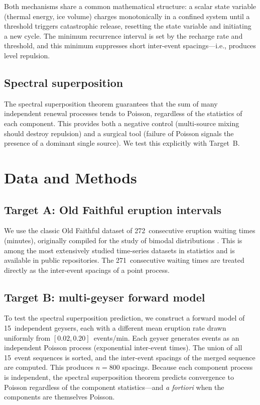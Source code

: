\documentclass[12pt,a4paper]{article}
\begin{document}
Both mechanisms share a common mathematical structure: a scalar state variable (thermal energy, ice volume) charges monotonically in a confined system until a threshold triggers catastrophic release, resetting the state variable and initiating a new cycle. The minimum recurrence interval is set by the recharge rate and threshold, and this minimum suppresses short inter-event spacings---i.e., produces level repulsion.

\subsection{Spectral superposition}

The spectral superposition theorem \citep{daley2003} guarantees that the sum of many independent renewal processes tends to Poisson, regardless of the statistics of each component. This provides both a negative control (multi-source mixing should destroy repulsion) and a surgical tool (failure of Poisson signals the presence of a dominant single source). We test this explicitly with Target~B.

\section{Data and Methods}

\subsection{Target A: Old Faithful eruption intervals}

We use the classic Old Faithful dataset of 272~consecutive eruption waiting times (minutes), originally compiled for the study of bimodal distributions \citep{azzalini1990,haerdle1991}. This is among the most extensively studied time-series datasets in statistics and is available in public repositories. The 271~consecutive waiting times are treated directly as the inter-event spacings of a point process.

\subsection{Target B: multi-geyser forward model}

To test the spectral superposition prediction, we construct a forward model of 15~independent geysers, each with a different mean eruption rate drawn uniformly from $[0.02,0.20]$~events/min. Each geyser generates events as an independent Poisson process (exponential inter-event times). The union of all 15~event sequences is sorted, and the inter-event spacings of the merged sequence are computed. This produces $n=800$ spacings. Because each component process is independent, the spectral superposition theorem predicts convergence to Poisson regardless of the component statistics---and \emph{a fortiori} when the components are themselves Poisson.
\end{document}
